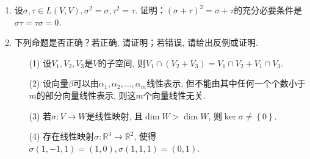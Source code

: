 \begin{enumerate}
    \item 设\(\sigma,\tau \in L(V,V),\sigma^2 = \sigma,\tau^2 = \tau\). 证明：\((\sigma + \tau)^2 = \sigma + \tau\)的充分必要条件是\(\sigma\tau = \tau\sigma = 0\).

    \item 下列命题是否正确？若正确, 请证明；若错误, 请给出反例或证明.
          \begin{enumerate}
              \item[(1)] 设\(V_1,V_2,V_3\)是\(V\)的子空间, 则\(V_1 \cap \left( V_2 + V_3 \right) = V_1 \cap V_2 + V_1 \cap V_3\).
              \item[(2)] 设向量\(\beta\)可以由\(\alpha_1,\alpha_2,\ldots,\alpha_{m}\)线性表示, 但不能由其中任何一个个数小于\(m\)的部分向量线性表示, 则这\(m\)个向量线性无关.
              \item[(3)] 若\(\sigma:V \rightarrow W\)是线性映射, 且\(\dim W > \dim W\), 则\(\ker\sigma \neq \left\{ 0 \right\}\).
              \item[(4)] 存在线性映射\(\sigma:\mathbb{R}^3 \rightarrow \mathbb{R}^2\), 使得\(\sigma(1, - 1,1) = (1,0),\sigma(1,1,1) = (0,1)\).
          \end{enumerate}
\end{enumerate}

\clearpage
